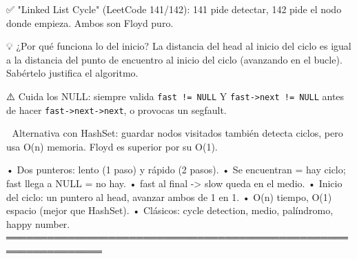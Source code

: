 \begin{dsaentrevistas}

✅ "Linked List Cycle" (LeetCode 141/142): 141 pide detectar, 142 pide
   el nodo donde empieza. Ambos son Floyd puro.

💡 ¿Por qué funciona lo del inicio? La distancia del head al inicio del
   ciclo es igual a la distancia del punto de encuentro al inicio del
   ciclo (avanzando en el bucle). Sabértelo justifica el algoritmo.

⚠️ Cuida los NULL: siempre valida \verb|fast != NULL| Y
   \verb|fast->next != NULL| antes de hacer \verb|fast->next->next|, o
   provocas un segfault.

🔑 Alternativa con HashSet: guardar nodos visitados también detecta
   ciclos, pero usa O(n) memoria. Floyd es superior por su O(1).

\end{dsaentrevistas}

\begin{dsaresumen}

• Dos punteros: lento (1 paso) y rápido (2 pasos).
• Se encuentran = hay ciclo; fast llega a NULL = no hay.
• fast al final -> slow queda en el medio.
• Inicio del ciclo: un puntero al head, avanzar ambos de 1 en 1.
• O(n) tiempo, O(1) espacio (mejor que HashSet).
• Clásicos: cycle detection, medio, palíndromo, happy number.
════════════════════════════════════════════════════════════════

\end{dsaresumen}
